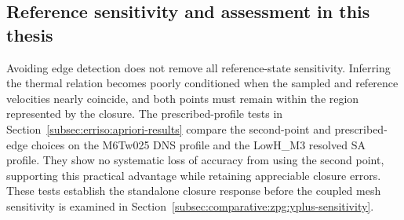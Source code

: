 \subsection{Reference sensitivity and assessment in this thesis}
\label{subsec:wall-functions:gao-li:limitations}

Avoiding edge detection does not remove all reference-state sensitivity. Inferring the thermal relation becomes poorly conditioned when the sampled and reference velocities nearly coincide, and both points must remain within the region represented by the closure. The prescribed-profile tests in Section~\ref{subsec:erriso:apriori-results} compare the second-point and prescribed-edge choices on the M6Tw025 DNS profile and the LowH\_M3 resolved SA profile. They show no systematic loss of accuracy from using the second point, supporting this practical advantage while retaining appreciable closure errors. These tests establish the standalone closure response before the coupled mesh sensitivity is examined in Section~\ref{subsec:comparative:zpg:yplus-sensitivity}.
